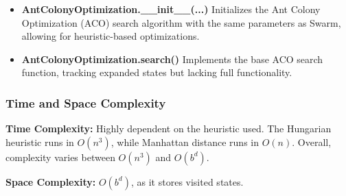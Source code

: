 \begin{itemize}
    \item \textbf{AntColonyOptimization.\_\_init\_\_(...)}  
    Initializes the Ant Colony Optimization (ACO) search algorithm with the same parameters as Swarm, allowing for heuristic-based optimizations.

    \item \textbf{AntColonyOptimization.search()}  
    Implements the base ACO search function, tracking expanded states but lacking full functionality.
\end{itemize}

\subsubsection{Time and Space Complexity}
\textbf{Time Complexity:} Highly dependent on the heuristic used. The Hungarian heuristic runs in \( O(n^3) \), while Manhattan distance runs in \( O(n) \). Overall, complexity varies between \( O(n^3) \) and \( O(b^d) \).

\textbf{Space Complexity:} \( O(b^d) \), as it stores visited states.